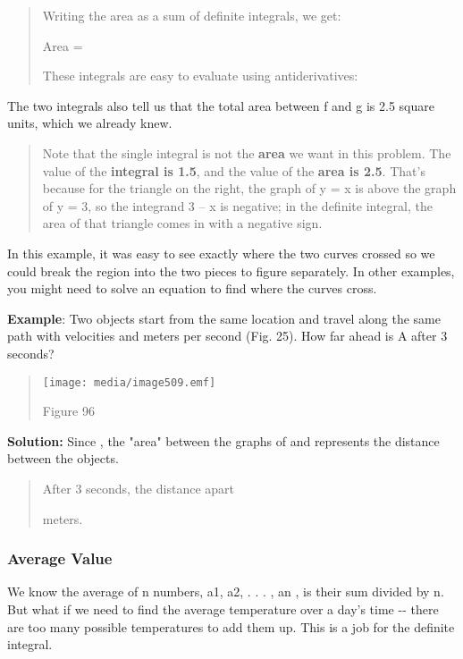 \begin{quote}
Writing the area as a sum of definite integrals, we get:

Area =

These integrals are easy to evaluate using antiderivatives:
\end{quote}

The two integrals also tell us that the total area between f and g is
2.5 square units, which we already knew.

\begin{quote}
Note that the single integral is not the \textbf{area} we want in this
problem. The value of the \textbf{integral is 1.5}, and the value of the
\textbf{area is 2.5}. That's because for the triangle on the right, the
graph of y = x is above the graph of y = 3, so the integrand 3 -- x is
negative; in the definite integral, the area of that triangle comes in
with a negative sign.
\end{quote}

In this example, it was easy to see exactly where the two curves crossed
so we could break the region into the two pieces to figure separately.
In other examples, you might need to solve an equation to find where the
curves cross.

\textbf{Example}: Two objects start from the same location and travel
along the same path with velocities and meters per second (Fig. 25). How
far ahead is A after 3 seconds?

\begin{quote}
\texttt{[image: media/image509.emf]}

Figure 96
\end{quote}

\textbf{Solution:} Since , the "area" between the graphs of and
represents the distance between the objects.

\begin{quote}
After 3 seconds, the distance apart

meters.
\end{quote}

\subsubsection{Average Value}\label{average-value}

We know the average of n numbers, a1, a2, . . . , an , is their sum
divided by n. But what if we need to find the average temperature over a
day's time -\/- there are too many possible temperatures to add them up.
This is a job for the definite integral.

